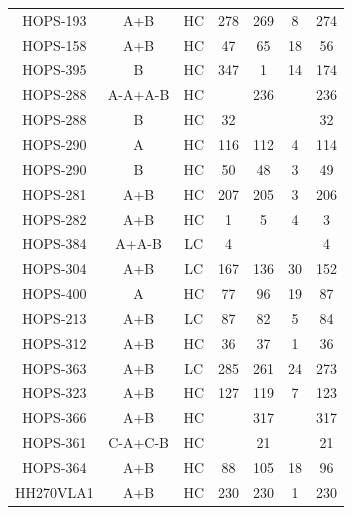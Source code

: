 \begin{deluxetable}
\begin{tabular}{ccccccc}
HOPS-193 & A+B & HC & 278 & 269 & 8 & 274 \\
HOPS-158 & A+B & HC & 47 & 65 & 18 & 56 \\
HOPS-395 & B & HC & 347 & 1 & 14 & 174 \\
HOPS-288 & A-A+A-B & HC & \nodata & 236 & \nodata & 236 \\
HOPS-288 & B & HC & 32 & \nodata & \nodata & 32 \\
HOPS-290 & A & HC & 116 & 112 & 4 & 114 \\
HOPS-290 & B & HC & 50 & 48 & 3 & 49 \\
HOPS-281 & A+B & HC & 207 & 205 & 3 & 206 \\
HOPS-282 & A+B & HC & 1 & 5 & 4 & 3 \\
HOPS-384 & A+A-B & LC & 4 & \nodata & \nodata & 4 \\
HOPS-304 & A+B & LC & 167 & 136 & 30 & 152 \\
HOPS-400 & A & HC & 77 & 96 & 19 & 87 \\
HOPS-213 & A+B & LC & 87 & 82 & 5 & 84 \\
HOPS-312 & A+B & HC & 36 & 37 & 1 & 36 \\
HOPS-363 & A+B & LC & 285 & 261 & 24 & 273 \\
HOPS-323 & A+B & HC & 127 & 119 & 7 & 123 \\
HOPS-366 & A+B & HC & \nodata & 317 & \nodata & 317 \\
HOPS-361 & C-A+C-B & HC & \nodata & 21 & \nodata & 21 \\
HOPS-364 & A+B & HC & 88 & 105 & 18 & 96 \\
HH270VLA1 & A+B & HC & 230 & 230 & 1 & 230 \\
\end{tabular}
\end{deluxetable}
